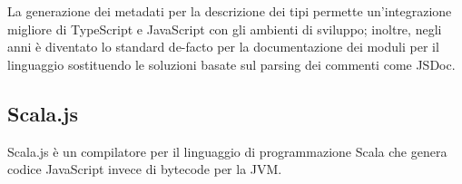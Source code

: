 


      La generazione dei metadati per la descrizione dei tipi permette un'integrazione migliore di TypeScript e JavaScript con gli ambienti di sviluppo;
      inoltre, negli anni è diventato lo standard de-facto per la documentazione dei moduli per il linguaggio sostituendo le soluzioni basate sul parsing dei commenti come JSDoc.

    \subsection{Scala.js}\label{subsec:scalajs}
      Scala.js è un compilatore per il linguaggio di programmazione Scala che genera codice JavaScript invece di bytecode per la JVM\@.


